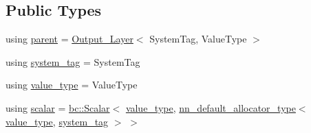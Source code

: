 \subsection*{Public Types}
\begin{DoxyCompactItemize}
\item 
using \hyperlink{structbc_1_1nn_1_1Logging__Output__Layer_a877dc26708c5c343e59500647b73db36}{parent} = \hyperlink{structbc_1_1nn_1_1Output__Layer}{Output\+\_\+\+Layer}$<$ System\+Tag, Value\+Type $>$
\item 
using \hyperlink{structbc_1_1nn_1_1Logging__Output__Layer_abeeff813d295dfb5d7b764a41c6ce557}{system\+\_\+tag} = System\+Tag
\item 
using \hyperlink{structbc_1_1nn_1_1Logging__Output__Layer_afc35d7b8c1f7d2f514a99a16845155ef}{value\+\_\+type} = Value\+Type
\item 
using \hyperlink{structbc_1_1nn_1_1Logging__Output__Layer_a4830f722f2588645f63804b804fe3879}{scalar} = \hyperlink{namespacebc_aa12ac55ee2c43dc082894dd3859daee1}{bc\+::\+Scalar}$<$ \hyperlink{structbc_1_1nn_1_1Logging__Output__Layer_afc35d7b8c1f7d2f514a99a16845155ef}{value\+\_\+type}, \hyperlink{namespacebc_1_1nn_a0025752fc3f47f988b3fae106c825860}{nn\+\_\+default\+\_\+allocator\+\_\+type}$<$ \hyperlink{structbc_1_1nn_1_1Logging__Output__Layer_afc35d7b8c1f7d2f514a99a16845155ef}{value\+\_\+type}, \hyperlink{structbc_1_1nn_1_1Logging__Output__Layer_abeeff813d295dfb5d7b764a41c6ce557}{system\+\_\+tag} $>$ $>$
\end{DoxyCompactItemize}
